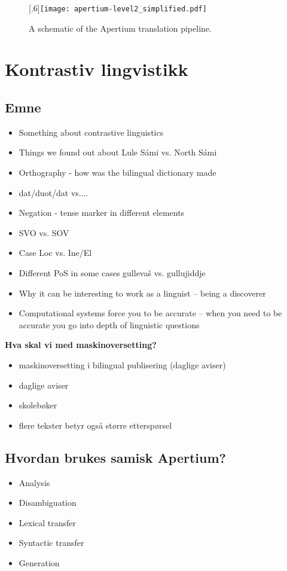 \documentclass[a4paper,english,12pt]{article}
\begin{document}
\begin{spacing}{1.0}
 
\begin{figure}
\centering
\scalebox{.6}[.6]{\texttt{[image: apertium-level2\_simplified.pdf]}}
\caption{A schematic of the Apertium translation pipeline.}
 \end{figure}


\section{Kontrastiv lingvistikk} 
\subsection{Emne}
\begin{itemize}
\item Something about contrastive linguistics  
\item Things we found out about Lule Sámi vs. North Sámi  
\item Orthography - how was the bilingual dictionary made  
\item dat/duot/dat vs.... 
\item Negation - tense marker in different elements  
\item SVO vs. SOV  
\item Case Loc vs. Ine/El  
\item Different PoS in some cases gullevaš vs. gullujiddje  
\item Why it can be interesting to work as a linguist -- being a discoverer  
\item Computational systems force you to be accurate -- when you need to be accurate you go into depth of linguistic questions
\end{itemize} 

\textbf{Hva skal vi med maskinoversetting?}
\begin{itemize}
\item maskinoversetting i bilingual publisering (daglige aviser)
\item daglige aviser
\item skolebøker
\item flere tekster betyr også større etterspørsel
\end{itemize}

\subsection{Hvordan brukes samisk Apertium?}

\begin{itemize}
\item Analysis
\item Disambiguation
\item Lexical transfer
\item Syntactic transfer
\item Generation
\end{itemize}


\end{spacing}
\end{document}
